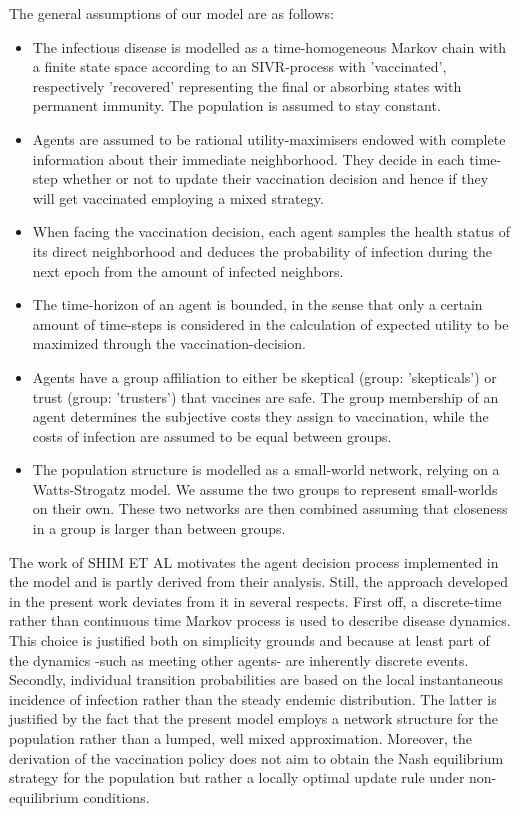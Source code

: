 \documentclass[11pt]{article}
\begin{document}

The general assumptions of our model are as follows:
\begin{itemize}
\item{The infectious disease is modelled as a time-homogeneous Markov chain with a finite state space according to an SIVR-process with 'vaccinated', respectively 'recovered' representing the final or absorbing states with permanent immunity. The population is assumed to stay constant.}
\item{Agents are assumed to be rational utility-maximisers endowed with complete information about their immediate neighborhood. They decide in each time-step whether or not to update their vaccination decision and hence if they will get vaccinated employing a mixed strategy.}
\item{When facing the vaccination decision, each agent samples the health status of its direct neighborhood and deduces the probability of infection during the next epoch from the amount of infected neighbors.}
\item{The time-horizon of an agent is bounded, in the sense that only a certain amount of time-steps is considered in the calculation of expected utility to be maximized through the vaccination-decision.}
\item{Agents have a group affiliation to either be skeptical (group: 'skepticals') or trust (group: 'trusters') that vaccines are safe. The group membership of an agent determines the subjective costs they assign to vaccination, while the costs of infection are assumed to be equal between groups.}
\item{The population structure is modelled as a small-world network, relying on a Watts-Strogatz model. We assume the two groups to represent small-worlds on their own. These two networks are then combined assuming that closeness in a group is larger than between groups.}
\end{itemize}
The work of SHIM ET AL motivates the agent decision process implemented in the model and is partly derived from their analysis. Still, the approach developed in the present work deviates from it in several respects. First off, a discrete-time rather than continuous time Markov process is used to describe disease dynamics. This choice is justified both on simplicity grounds and because at least part of the dynamics -such as meeting other agents- are inherently discrete events. Secondly, individual transition probabilities are based on the local instantaneous incidence of infection rather than the steady endemic distribution. The latter is justified by the fact that the present model employs a network structure for the population rather than a lumped, well mixed approximation. Moreover, the derivation of the vaccination policy does not aim to obtain the Nash equilibrium strategy for the population but rather a locally optimal update rule under non-equilibrium conditions.
\end{document}
